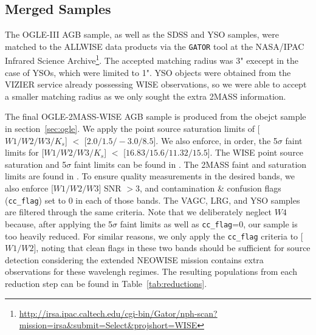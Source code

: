 \subsection{Merged Samples\label{sec:merged}}
The OGLE-III AGB sample, as well as the SDSS and YSO samples, were matched to the ALLWISE data products via the {\tt GATOR} tool at the NASA/IPAC Infrared Science Archive\footnote{\url{http://irsa.ipac.caltech.edu/cgi-bin/Gator/nph-scan?mission=irsa&submit=Select&projshort=WISE}}. The accepted matching radius was 3" execept in the case of YSOs, which were limited to 1". YSO objects were obtained from the VIZIER service already possessing WISE observations, so we were able to accept a smaller matching radius as we only sought the extra 2MASS information.

The final OGLE-2MASS-WISE AGB sample is produced from the obejct sample in section~\ref{sec:ogle}. We apply the point source saturation limits of [$W1/W2/W3/K_s$] $<$ [$2.0/1.5/-3.0/8.5$]. We also enforce, in order, the 5$\sigma$ faint limits for [$W1/W2/W3/K_s$]  $<$ [$16.83/15.6/11.32/15.5$]. The WISE point source saturation and 5$\sigma$ faint limits can be found in \cite{2012wise.rept....1C}. The 2MASS faint and saturation limits are found in \cite{2006AJ....131.1163S}. To ensure quality measurements in the desired bands, we also enforce [$W1/W2/W3$] SNR $> 3$, and contamination \& confusion flags ({\tt cc\_flag}) set to 0 in each of those bands. The VAGC, LRG, and YSO samples are filtered through the same criteria. Note that we deliberately neglect $W4$ because, after applying the 5$\sigma$ faint limits as well as {\tt cc\_flag}=0, our sample is too heavily reduced. For similar reasons, we only apply the {\tt cc\_flag} criteria to [$W1/W2$], noting that clean flags in these two bands should be sufficient for source detection considering the extended NEOWISE mission contains extra observations for these wavelengh regimes. The resulting populations from each reduction step can be found in Table~\ref{tab:reductions}.

